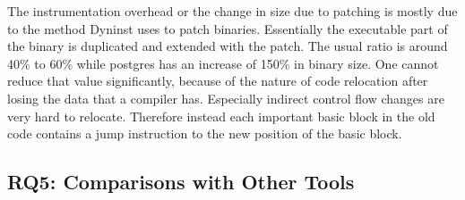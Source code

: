 The instrumentation overhead or the change in size due to patching is mostly due to the method Dyninst uses to patch binaries. 
Essentially the executable part of the binary is duplicated and extended with the patch. The usual ratio is around 40\% to 
60\% while postgres has an increase of 150\% in binary size. One cannot reduce that value significantly, 
because of the nature of code relocation after losing the data that a compiler has. Especially indirect control flow 
changes are very hard to relocate. Therefore instead each important basic block in the old code contains a jump 
instruction to the new position of the basic block.

\subsection{RQ5: Comparisons with Other Tools}
\label{RQ5: Is TypeShield better than other tools?}
\begin{table}[!h]
	\caption {The medians of calltargets per callsite for different tools that we have values for}
	\label{tbl:toolcompare}
\end{table}

